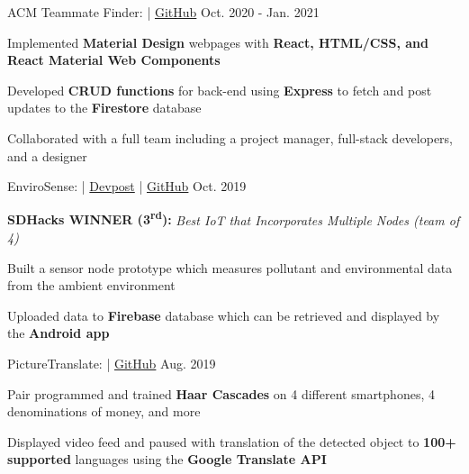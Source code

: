 

\begin{cventries}
	\cvproject
	{ACM Teammate Finder:  | \href{https://github.com/LelandTLong/ACM_Project}{\textcolor{awesome-skyblue}{\faGithub \enspace GitHub}}}
	{Oct. 2020 - Jan. 2021}
	{
		\begin{cvitems}
			\item Implemented \textbf{Material Design} webpages with \textbf{React, HTML/CSS, and React Material Web Components}
			\item Developed \textbf{CRUD functions} for back-end using \textbf{Express} to fetch and post updates to the \textbf{Firestore} database
		    \item Collaborated with a full team including a project manager, full-stack developers, and a designer
		\end{cvitems}
	}

	\cvproject
	{EnviroSense:  | \href{https://devpost.com/software/envirosense}{\textcolor{awesome-skyblue}{Devpost}} | \href{https://github.com/jerukan/EnviroSense}{\textcolor{awesome-skyblue}{\faGithub \enspace GitHub}}}
	{Oct. 2019}
	{
		\begin{cvitems}
			\item \textbf{SDHacks WINNER (3\textsuperscript{rd}):} \textit{Best IoT that Incorporates Multiple Nodes (team of 4)}
			\item Built a sensor node prototype which measures pollutant and environmental data from the ambient environment
			\item Uploaded data to \textbf{Firebase} database which can be retrieved and displayed by the \textbf{Android app}
		\end{cvitems}
	}

	\cvproject
	{PictureTranslate:  |  \href{https://github.com/ucsd-cse-spis-2019/project-tristin-caroline}{\textcolor{awesome-skyblue}{\faGithub \enspace GitHub}}}
	{Aug. 2019}
	{
		\begin{cvitems}
			\item Pair programmed and trained \textbf{Haar Cascades} on 4 different smartphones, 4 denominations of money, and more
			\item Displayed video feed and paused with translation of the detected object to \textbf{100+ supported} languages using the \textbf{Google Translate API}
		\end{cvitems}
	}
\end{cventries}